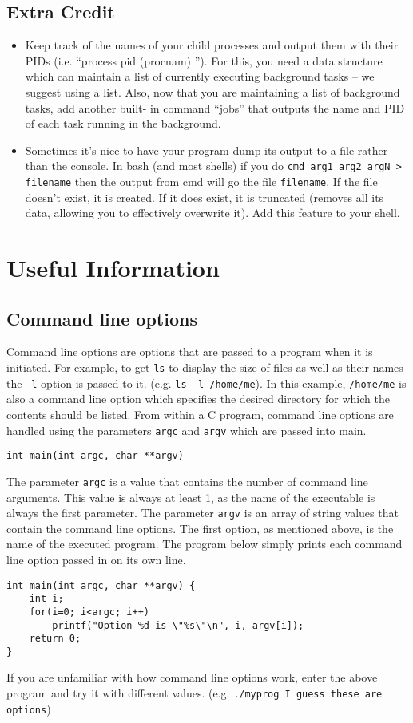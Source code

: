 \documentclass[letterpaper,10pt]{article}
\newcommand{\cmd}[1]{\texttt{#1}}
\begin{document}
\subsection{Extra Credit}
\begin{itemize}
 \item  Keep track of the names of your child processes and output them with their PIDs (i.e. ``process pid
  (procnam) ''). For this, you need a data structure which can maintain a list of currently executing background
  tasks – we suggest using a list. Also, now that you are maintaining a list of background tasks, add another built-
  in command ``jobs'' that outputs the name and PID of each task running in the background.
 \item Sometimes it's nice to have your program dump its output to a file rather than the console. In bash (and most
 shells) if you do \verb+cmd arg1 arg2 argN > filename+ then the output from cmd will go the file \cmd{filename}.
 If the file doesn't exist, it is created. If it does exist, it is truncated (removes all its data, allowing you to effectively
 overwrite it). Add this feature to your shell.
\end{itemize}

\section{Useful Information}
\subsection{Command line options} \label{cmdline}
Command line options are options that are passed to a program when it is initiated. For example, to get \cmd{ls} to
display the size of files as well as their names the \cmd{-l} option is passed to it. (e.g. \cmd{ls –l /home/me}).
In this example, \cmd{/home/me} is also a command line option which specifies the desired directory for which the contents
should be listed. From within a C program, command line options are handled using the parameters \cmd{argc} and
\cmd{argv} which are passed into main.
\begin{verbatim}
int main(int argc, char **argv)
\end{verbatim}
The parameter \cmd{argc} is a value that contains the number of command line arguments. This value is always at
least 1, as the name of the executable is always the first parameter. The parameter \cmd{argv} is an array of string
values that contain the command line options. The first option, as mentioned above, is the name of the
executed program. The program below simply prints each command line option passed in on its own line.
\begin{verbatim}
int main(int argc, char **argv) {
    int i;
    for(i=0; i<argc; i++)
        printf("Option %d is \"%s\"\n", i, argv[i]);
    return 0;
}
\end{verbatim}
If you are unfamiliar with how command line options work, enter the above program and try it with different
values. (e.g. \verb+./myprog I guess these are options+)
\end{document}
